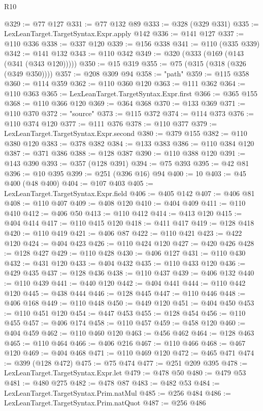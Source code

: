\begin{lexlean}{R10}
\begin{coremodule}
{{{{{{{{{{{{{{{{{{{{{{{{{{{{{{{{{{{{{{{{{{{{{{{{{{{{{{{{{{{{{{{{{{{{{{{{{{{{{{{{{{{{@329 := @77 @127
@331 := @77 @132 @89
@333 := @328 (@329 @331)
@335 := LexLeanTarget.TargetSyntax.Expr.apply @142
@336 := @141 @127
@337 := @110 @336
@338 := @337 @120
@339 := @156 @338
@341 := @110 (@335 @339)
@342 := @141 @132
@343 := @110 @342
@349 := @320 (@333 (@169 (@143 (@341 (@343 @120)))))
@350 := @15 @319
@355 := @75 (@315 (@318 (@326 (@349 @350))))
@357 := @208 @309 @94
@358 := "path"
@359 := @115 @358
@360 := @114 @359
@362 := @110 @360 @120
@363 := @111 @362
@364 := @110 @363
@365 := LexLeanTarget.TargetSyntax.Expr.first
@366 := @365 @155
@368 := @110 @366 @120
@369 := @364 @368
@370 := @133 @369
@371 := @110 @370
@372 := "source"
@373 := @115 @372
@374 := @114 @373
@376 := @110 @374 @120
@377 := @111 @376
@378 := @110 @377
@379 := LexLeanTarget.TargetSyntax.Expr.second
@380 := @379 @155
@382 := @110 @380 @120
@383 := @378 @382
@384 := @133 @383
@386 := @110 @384 @120
@387 := @371 @386
@388 := @128 @387
@390 := @110 @388 @120
@391 := @143 @390
@393 := @357 (@128 @391)
@394 := @75 @393
@395 := @42 @81
@396 := @10 @395
@399 := @251 (@396 @16) @94
@400 := 10
@403 := @45 @400 (@48 @400)
@404 := @107 @403
@405 := LexLeanTarget.TargetSyntax.Expr.field
@406 := @405 @142
@407 := @406 @81
@408 := @110 @407
@409 := @408 @120
@410 := @404 @409
@411 := @110 @410
@412 := @406 @50
@413 := @110 @412
@414 := @413 @120
@415 := @404 @414
@417 := @110 @415 @120
@418 := @411 @417
@419 := @128 @418
@420 := @110 @419
@421 := @406 @87
@422 := @110 @421
@423 := @422 @120
@424 := @404 @423
@426 := @110 @424 @120
@427 := @420 @426
@428 := @128 @427
@429 := @110 @428
@430 := @406 @127
@431 := @110 @430
@432 := @431 @120
@433 := @404 @432
@435 := @110 @433 @120
@436 := @429 @435
@437 := @128 @436
@438 := @110 @437
@439 := @406 @132
@440 := @110 @439
@441 := @440 @120
@442 := @404 @441
@444 := @110 @442 @120
@445 := @438 @444
@446 := @128 @445
@447 := @110 @446
@448 := @406 @168
@449 := @110 @448
@450 := @449 @120
@451 := @404 @450
@453 := @110 @451 @120
@454 := @447 @453
@455 := @128 @454
@456 := @110 @455
@457 := @406 @174
@458 := @110 @457
@459 := @458 @120
@460 := @404 @459
@462 := @110 @460 @120
@463 := @456 @462
@464 := @128 @463
@465 := @110 @464
@466 := @406 @216
@467 := @110 @466
@468 := @467 @120
@469 := @404 @468
@471 := @110 @469 @120
@472 := @465 @471
@474 := @399 (@128 @472)
@475 := @75 @474
@477 := @251 @209 @395
@478 := LexLeanTarget.TargetSyntax.Expr.let
@479 := @478 @50
@480 := @479 @53
@481 := @480 @275
@482 := @478 @87
@483 := @482 @53
@484 := LexLeanTarget.TargetSyntax.Prim.natMul
@485 := @256 @484
@486 := LexLeanTarget.TargetSyntax.Prim.natQuot
@487 := @256 @486
}}}}}}}}}}}}}}}}}}}}}}}}}}}}}}}}}}}}}}}}}}}}}}}}}}}}}}}}}}}}}}}}}}}}}}}}}}}}}}}}}}}}
\end{coremodule}
\end{lexlean}
